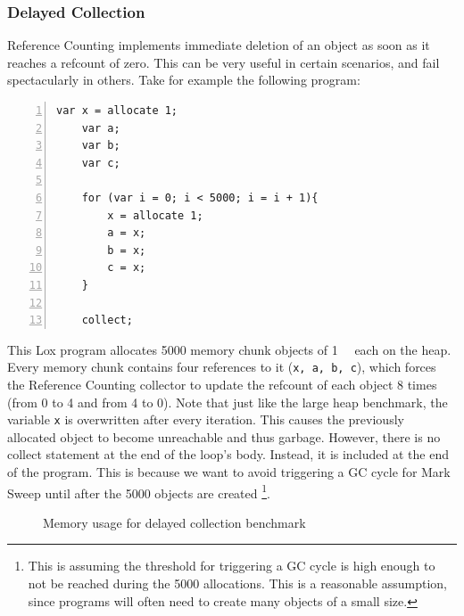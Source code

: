 \documentclass[10pt]{extarticle}
\begin{document}
\subsubsection{Delayed Collection}

Reference Counting implements immediate deletion of an object as soon as it reaches a refcount of zero. This can be very useful in certain scenarios, and fail spectacularly in others. Take for example the following program: 

\begin{lstlisting}[numbers=left]
    var x = allocate 1;
    var a;
    var b;
    var c;

    for (var i = 0; i < 5000; i = i + 1){
        x = allocate 1;
        a = x;
        b = x;
        c = x;
    }

    collect;
\end{lstlisting}

This Lox program allocates 5000 memory chunk objects of \SI{1}{\kilo\byte} each on the heap. Every memory chunk contains four references to it (\lstinline{x, a, b, c}), which forces the Reference Counting collector to update the refcount of each object 8 times (from 0 to 4 and from 4 to 0). Note that just like the large heap benchmark, the variable \lstinline{x} is overwritten after every iteration. This causes the previously allocated object to become unreachable and thus garbage. However, there is no collect statement at the end of the loop's body. Instead, it is included at the end of the program. This is because we want to avoid triggering a GC cycle for Mark Sweep until after the 5000 objects are created \footnote{This is assuming the threshold for triggering a GC cycle is high enough to not be reached during the 5000 allocations. This is a reasonable assumption, since programs will often need to create many objects of a small size.}. 

\begin{figure}[h]%
    \centering
    \qquad
    \caption{Memory usage for delayed collection benchmark}
\end{figure}
\end{document}
